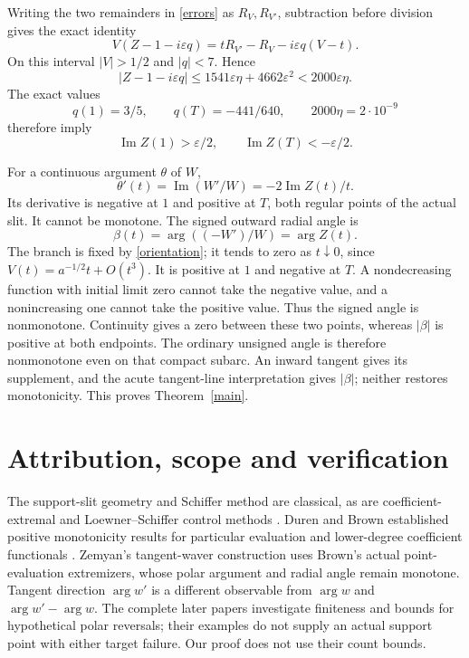 \documentclass[10pt]{article}
\newcommand{\eps}{\varepsilon}
\newcommand{\Ima}{\operatorname{Im}}
\begin{document}
Writing the two remainders in \eqref{errors} as \(R_V,R_{V'}\),
subtraction before division gives the exact identity
\[
 V(Z-1-i\eps q)=tR_{V'}-R_V-i\eps q(V-t).
\]
On this interval \(|V|>1/2\) and \(|q|<7\). Hence
\begin{equation}\label{Zerror}
 |Z-1-i\eps q|
 \le1541\eps\eta+4662\eps^2<2000\eps\eta .
\end{equation}
The exact values
\[
 q(1)=3/5,\qquad q(T)=-441/640,\qquad2000\eta=2\cdot10^{-9}
\]
therefore imply
\[
                  \Ima Z(1)>\eps/2,\qquad
                  \Ima Z(T)<-\eps/2 .
\]

For a continuous argument \(\theta\) of \(W\),
\[
       \theta'(t)=\Ima(W'/W)=-2\Ima Z(t)/t.
\]
Its derivative is negative at \(1\) and positive at \(T\), both
regular points of the actual slit. It cannot be monotone.
The signed outward radial angle is
\[
              \beta(t)=\arg((-W')/W)=\arg Z(t).
\]
The branch is fixed by \eqref{orientation}; it tends to zero as
\(t\downarrow0\), since \(V(t)=a^{-1/2}t+O(t^3)\).
It is positive at \(1\) and negative at \(T\).
A nondecreasing function with initial limit zero cannot take
the negative value, and a nonincreasing one cannot take the positive
value. Thus the signed angle is nonmonotone.
Continuity gives a zero between these two points, whereas
\(|\beta|\) is positive at both endpoints. The ordinary unsigned
angle is therefore nonmonotone even on that compact subarc.
An inward tangent gives its supplement, and the acute tangent-line
interpretation gives \(|\beta|\); neither restores monotonicity.
This proves Theorem~\ref{main}.

\section{Attribution, scope and verification}
The support-slit geometry and Schiffer method are classical, as are
coefficient-extremal and Loewner--Schiffer control methods
\cite{FS}. Duren and Brown established positive monotonicity results
for particular evaluation and lower-degree coefficient functionals
\cite{Duren,Brown79,Brown}.
Zemyan's tangent-waver construction \cite{Zemyan03} uses Brown's
actual point-evaluation extremizers, whose polar argument and radial
angle remain monotone. Tangent direction \(\arg w'\) is a different
observable from \(\arg w\) and \(\arg w'-\arg w\).
The complete later papers \cite{Zemyan05,Zemyan07} investigate
finiteness and bounds for hypothetical polar reversals; their examples
do not supply an actual support point with either target failure.
Our proof does not use their count bounds.
\end{document}
